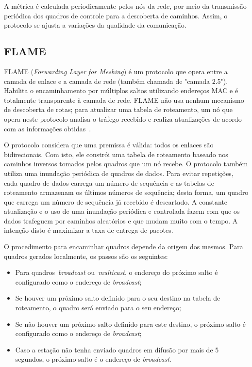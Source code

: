 \documentclass[letterpaper, 10 pt, conference]{ieeeconf}  %
\begin{document}
A métrica é calculada periodicamente pelos nós da rede, por meio da transmissão periódica dos quadros de controle para a descoberta de caminhos. Assim, o protocolo se ajusta a variações da qualidade da comunicação.

\subsection{FLAME}

FLAME (\textit{Forwarding Layer for Meshing}) é um protocolo que opera entre a camada de enlace e a camada de rede (também chamada de "camada 2.5"). Habilita o encaminhamento por múltiplos saltos utilizando endereços MAC e é totalmente transparente à camada de rede. FLAME não usa nenhum mecanismo de descoberta de rotas; para atualizar uma tabela de roteamento, um nó que opera neste protocolo analisa o tráfego recebido e realiza atualizações de acordo com as informações obtidas~\cite{andreev2010,graaf2007}.

O protocolo considera que uma premissa é válida: todos os enlaces são bidirecionais. Com isto, ele constrói uma tabela de roteamento baseado nos caminhos inversos tomados pelos quadros que um nó recebe. O protocolo também utiliza uma inundação periódica de quadros de dados. Para evitar repetições, cada quadro de dados carrega um número de sequência e as tabelas de roteamento armazenam os últimos números de sequência; desta forma, um quadro que carrega um número de sequência já recebido é descartado. A constante atualização e o uso de uma inundação periódica e controlada fazem com que os dados trafeguem por caminhos aleatórios e que mudam muito com o tempo. A intenção disto é maximizar a taxa de entrega de pacotes.

O procedimento para encaminhar quadros depende da origem dos mesmos. Para quadros gerados localmente, os passos são os seguintes:

\begin{itemize}
	\item Para quadros~\textit{broadcast} ou~\textit{multicast}, o endereço do próximo salto é configurado como o endereço de \textit{broadcast};
    \item Se houver um próximo salto definido para o seu destino na tabela de roteamento, o quadro será enviado para o seu endereço;
    \item Se não houver um próximo salto definido para este destino, o próximo salto é configurado como o endereço de \textit{broadcast};
    \item Caso a estação não tenha enviado quadros em difusão por mais de 5 segundos, o próximo salto é o endereço de \textit{broadcast}.
\end{itemize}
\end{document}
